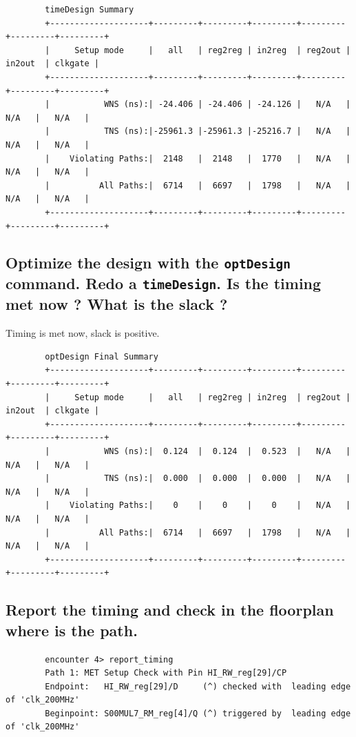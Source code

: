 \documentclass[11pt,a4paper,sans,dvipsnames]{report}
\begin{document}
	\begin{lstlisting}
		timeDesign Summary                             
		+--------------------+---------+---------+---------+---------+---------+---------+
		|     Setup mode     |   all   | reg2reg | in2reg  | reg2out | in2out  | clkgate |
		+--------------------+---------+---------+---------+---------+---------+---------+
		|           WNS (ns):| -24.406 | -24.406 | -24.126 |   N/A   |   N/A   |   N/A   |
		|           TNS (ns):|-25961.3 |-25961.3 |-25216.7 |   N/A   |   N/A   |   N/A   |
		|    Violating Paths:|  2148   |  2148   |  1770   |   N/A   |   N/A   |   N/A   |
		|          All Paths:|  6714   |  6697   |  1798   |   N/A   |   N/A   |   N/A   |
		+--------------------+---------+---------+---------+---------+---------+---------+
	\end{lstlisting}

	\subsection*{Optimize the design with the \texttt{optDesign} command. Redo a \texttt{timeDesign}. Is the timing met now ? What is the slack ?}
	Timing is met now, slack is positive.
	\begin{lstlisting}
		optDesign Final Summary                             
		+--------------------+---------+---------+---------+---------+---------+---------+
		|     Setup mode     |   all   | reg2reg | in2reg  | reg2out | in2out  | clkgate |
		+--------------------+---------+---------+---------+---------+---------+---------+
		|           WNS (ns):|  0.124  |  0.124  |  0.523  |   N/A   |   N/A   |   N/A   |
		|           TNS (ns):|  0.000  |  0.000  |  0.000  |   N/A   |   N/A   |   N/A   |
		|    Violating Paths:|    0    |    0    |    0    |   N/A   |   N/A   |   N/A   |
		|          All Paths:|  6714   |  6697   |  1798   |   N/A   |   N/A   |   N/A   |
		+--------------------+---------+---------+---------+---------+---------+---------+
	\end{lstlisting}

	\subsection*{Report the timing and check in the floorplan where is the path.}
	\begin{lstlisting}
		encounter 4> report_timing                 
		Path 1: MET Setup Check with Pin HI_RW_reg[29]/CP 
		Endpoint:   HI_RW_reg[29]/D     (^) checked with  leading edge of 'clk_200MHz'
		Beginpoint: S00MUL7_RM_reg[4]/Q (^) triggered by  leading edge of 'clk_200MHz'
	\end{lstlisting}
\end{document}
